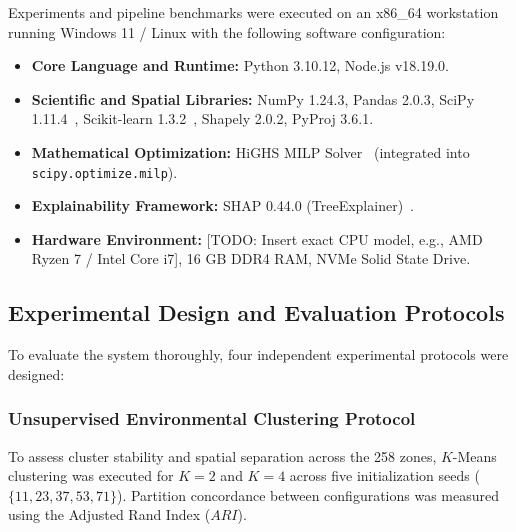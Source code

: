 Experiments and pipeline benchmarks were executed on an x86\_64 workstation running Windows 11 / Linux with the following software configuration:
\begin{itemize}
    \item \textbf{Core Language and Runtime:} Python 3.10.12, Node.js v18.19.0.
    \item \textbf{Scientific and Spatial Libraries:} NumPy 1.24.3, Pandas 2.0.3, SciPy 1.11.4~\cite{virtanen2020scipy}, Scikit-learn 1.3.2~\cite{pedregosa2011scikit}, Shapely 2.0.2, PyProj 3.6.1.
    \item \textbf{Mathematical Optimization:} HiGHS MILP Solver~\cite{huang2023highs} (integrated into \texttt{scipy.optimize.milp}).
    \item \textbf{Explainability Framework:} SHAP 0.44.0 (TreeExplainer)~\cite{lundberg2017unified}.
    \item \textbf{Hardware Environment:} [TODO: Insert exact CPU model, e.g., AMD Ryzen 7 / Intel Core i7], 16 GB DDR4 RAM, NVMe Solid State Drive.
\end{itemize}

\subsection{Experimental Design and Evaluation Protocols}
\label{sec:setup_protocol}

To evaluate the system thoroughly, four independent experimental protocols were designed:

\subsubsection{Unsupervised Environmental Clustering Protocol}
To assess cluster stability and spatial separation across the 258 zones, $K$-Means clustering was executed for $K=2$ and $K=4$ across five initialization seeds ($\{11, 23, 37, 53, 71\}$). Partition concordance between configurations was measured using the Adjusted Rand Index ($ARI$).

